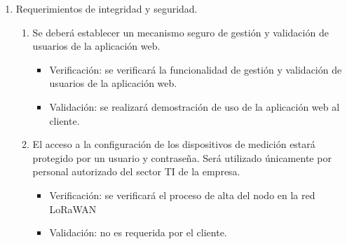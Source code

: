 \documentclass[
11pt, %
]{charter}
\begin{document}
\begin{enumerate}
	\item Requerimientos de integridad y seguridad.
		\begin{enumerate}
			\item Se deberá establecer un mecanismo seguro de gestión y validación de usuarios de la aplicación web.
			\begin{itemize}
				\item Verificación: se verificará la funcionalidad de gestión y validación de usuarios de la aplicación web.
				\item Validación: se realizará demostración de uso de la aplicación web al cliente.
			\end{itemize}
			\item El acceso a la configuración de los dispositivos de medición estará protegido por un usuario y contraseña. Será utilizado únicamente por personal autorizado del sector TI de la empresa.
			\begin{itemize}
				\item Verificación: se verificará el proceso de alta del nodo en la red LoRaWAN
				\item Validación: no es requerida por el cliente.
			\end{itemize}
		\end{enumerate}
	

\end{enumerate}
\end{document}
